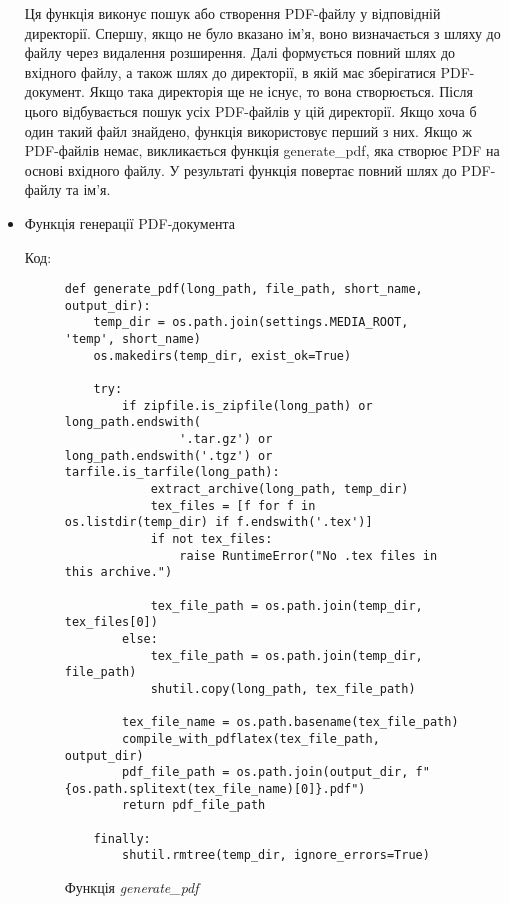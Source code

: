 \documentclass[a4paper,14pt]{extarticle}
\numberwithin{figure}{section}
\begin{document}
\begin{itemize}
    Ця функція виконує пошук або створення PDF-файлу у відповідній директорії.
    Спершу, якщо не було вказано ім'я, воно визначається з шляху до файлу через видалення розширення. Далі формується повний шлях до вхідного файлу, а також шлях до директорії, в якій має зберігатися PDF-документ. Якщо така директорія ще не існує, то вона створюється. Після цього відбувається пошук усіх PDF-файлів у цій директорії. Якщо хоча б один такий файл знайдено, функція використовує перший з них. Якщо ж PDF-файлів немає, викликається функція generate\_pdf, яка створює PDF на основі вхідного файлу.
    У результаті функція повертає повний шлях до PDF-файлу та ім’я.

    \newpage
    \item Функція генерації PDF-документа

    Код:
    \begin{figure}[h]
    \centering
    \begin{lstlisting}[style=mystyle]
    def generate_pdf(long_path, file_path, short_name, output_dir):
    temp_dir = os.path.join(settings.MEDIA_ROOT, 'temp', short_name)
    os.makedirs(temp_dir, exist_ok=True)

    try:
        if zipfile.is_zipfile(long_path) or long_path.endswith(
                '.tar.gz') or long_path.endswith('.tgz') or tarfile.is_tarfile(long_path):
            extract_archive(long_path, temp_dir)
            tex_files = [f for f in os.listdir(temp_dir) if f.endswith('.tex')]
            if not tex_files:
                raise RuntimeError("No .tex files in this archive.")

            tex_file_path = os.path.join(temp_dir, tex_files[0])
        else:
            tex_file_path = os.path.join(temp_dir, file_path)
            shutil.copy(long_path, tex_file_path)

        tex_file_name = os.path.basename(tex_file_path)
        compile_with_pdflatex(tex_file_path, output_dir)
        pdf_file_path = os.path.join(output_dir, f"{os.path.splitext(tex_file_name)[0]}.pdf")
        return pdf_file_path

    finally:
        shutil.rmtree(temp_dir, ignore_errors=True)
    \end{lstlisting}
    \caption{\normalsize Функція \textit{generate\_pdf}}
    \end{figure}


\end{itemize}
\end{document}

